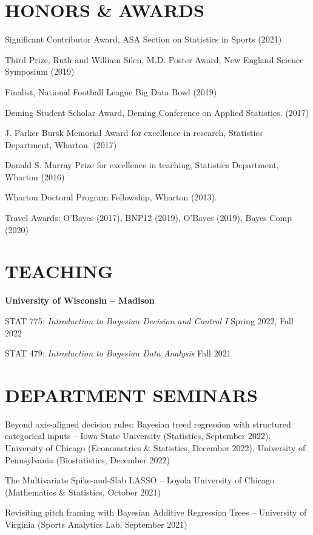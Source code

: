 \documentclass[margin]{res}
\begin{document}
\begin{resume}
\section{HONORS \& AWARDS} 

Significant Contributor Award, ASA Section on Statistics in Sports (2021)

Third Prize, Ruth and William Silen, M.D. Poster Award, New England Science Symposium (2019)

Finalist, National Football League Big Data Bowl (2019)

Deming Student Scholar Award, Deming Conference on Applied Statistics. (2017)

J. Parker Bursk Memorial Award for excellence in research, Statistics Department, Wharton. (2017)

Donald S. Murray Prize for excellence in teaching, Statistics Department, Wharton (2016)

Wharton Doctoral Program Fellowship, Wharton (2013).

Travel Awards: O'Bayes (2017), BNP12 (2019), O'Bayes (2019), Bayes Comp (2020)

\section{TEACHING}

\textbf{University of Wisconsin -- Madison} 

STAT 775: {\it Introduction to Bayesian Decision and Control I} \hfill Spring 2022, Fall 2022

STAT 479: {\it Introduction to Bayesian Data Analysis} \hfill Fall 2021

\section{DEPARTMENT \hspace{0.1in} SEMINARS}

Beyond axis-aligned decision rules: Bayesian treed regression with structured categorical inputs -- Iowa State University (Statistics, September 2022), University of Chicago (Econometrics \& Statistics, December 2022), University of Pennsylvania (Biostatistics, December 2022)

The Multivariate Spike-and-Slab LASSO -- Loyola University of Chicago (Mathematics \& Statistics, October 2021)

Revisiting pitch framing with Bayesian Additive Regression Trees -- University of Virginia (Sports Analytics Lab, September 2021)


\end{resume}
\end{document}
